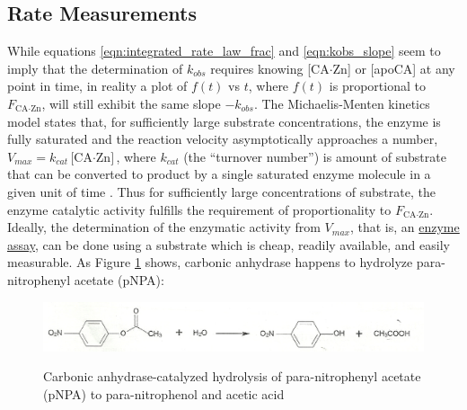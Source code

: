 \subsection{Rate Measurements}
While equations \eqref{eqn:integrated_rate_law_frac} and \eqref{eqn:kobs_slope} seem to imply that the determination of $k_{obs}$ requires knowing [CA$\cdot$Zn] or [apoCA] at any point in time, in reality a plot of $f(t)$ vs $t$, where $f(t)$ is proportional to $F_\text{CA$\cdot$Zn}$, will still exhibit the same slope $-k_{obs}$. The Michaelis-Menten kinetics model states that, for sufficiently large substrate concentrations, the enzyme is fully saturated and the reaction velocity asymptotically approaches a number, $V_{max}=k_{cat}\text{[CA$\cdot$Zn]}$, where $k_{cat}$ (the ``turnover number'') is amount of substrate that can be converted to product by a single saturated enzyme molecule in a given unit of time \cite{bib:lehninger_mm}. Thus for sufficiently large concentrations of substrate, the enzyme catalytic activity fulfills the requirement of proportionality to $F_\text{CA$\cdot$Zn}$. Ideally, the determination of the enzymatic activity from $V_{max}$, that is, an \underline{enzyme assay}, can be done using a substrate which is cheap, readily available, and easily measurable. As Figure \ref{fig:pnpa_reaction} shows, carbonic anhydrase happens to hydrolyze para-nitrophenyl acetate (pNPA):
\begin{figure}[h]
  \includegraphics[width=.9\textwidth]{./Figures/pnpa_hydrolysis.jpg}\\
  \caption{Carbonic anhydrase-catalyzed hydrolysis of para-nitrophenyl acetate (pNPA) to para-nitrophenol and acetic acid \cite{lab_manual}}\label{fig:pnpa_reaction}
\end{figure}